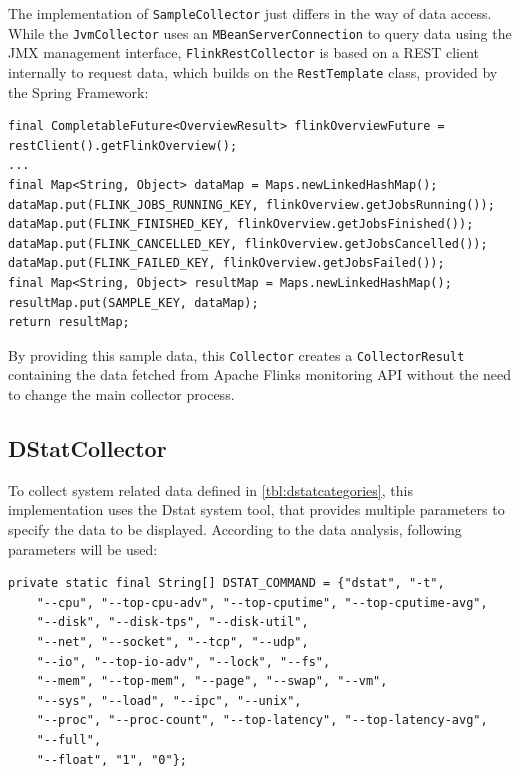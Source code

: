 The implementation of \verb|SampleCollector| just differs in the way of data access. While the \verb|JvmCollector| uses an \verb|MBeanServerConnection|
to query data using the JMX management interface, \verb|FlinkRestCollector| is based on a REST client internally to request data, which builds
on the \verb|RestTemplate| class, provided by the Spring Framework:

\begin{lstlisting}[caption={"FlinkRestCollector" Rest client}, captionpos=b, label={lst:flink-rest-collector-client}]
final CompletableFuture<OverviewResult> flinkOverviewFuture = restClient().getFlinkOverview();
...
final Map<String, Object> dataMap = Maps.newLinkedHashMap();
dataMap.put(FLINK_JOBS_RUNNING_KEY, flinkOverview.getJobsRunning());
dataMap.put(FLINK_FINISHED_KEY, flinkOverview.getJobsFinished());
dataMap.put(FLINK_CANCELLED_KEY, flinkOverview.getJobsCancelled());
dataMap.put(FLINK_FAILED_KEY, flinkOverview.getJobsFailed());
final Map<String, Object> resultMap = Maps.newLinkedHashMap();
resultMap.put(SAMPLE_KEY, dataMap);
return resultMap;
\end{lstlisting}

By providing this sample data, this \verb|Collector| creates a \verb|CollectorResult| containing the data fetched from Apache Flinks monitoring
API without the need to change the main collector process.

\subsection{DStatCollector}

To collect system related data defined in \autoref{tbl:dstatcategories}, this implementation uses the Dstat system tool,
that provides multiple parameters to specify the data to be displayed. According to the data analysis, following parameters will be used:

\begin{lstlisting}[caption={"DstatCollector" program parameters in }, captionpos=b, label={lst:dstat-parameters}]
private static final String[] DSTAT_COMMAND = {"dstat", "-t",
    "--cpu", "--top-cpu-adv", "--top-cputime", "--top-cputime-avg",
    "--disk", "--disk-tps", "--disk-util",
    "--net", "--socket", "--tcp", "--udp",
    "--io", "--top-io-adv", "--lock", "--fs",
    "--mem", "--top-mem", "--page", "--swap", "--vm",
    "--sys", "--load", "--ipc", "--unix",
    "--proc", "--proc-count", "--top-latency", "--top-latency-avg",
    "--full",
    "--float", "1", "0"};
\end{lstlisting}

